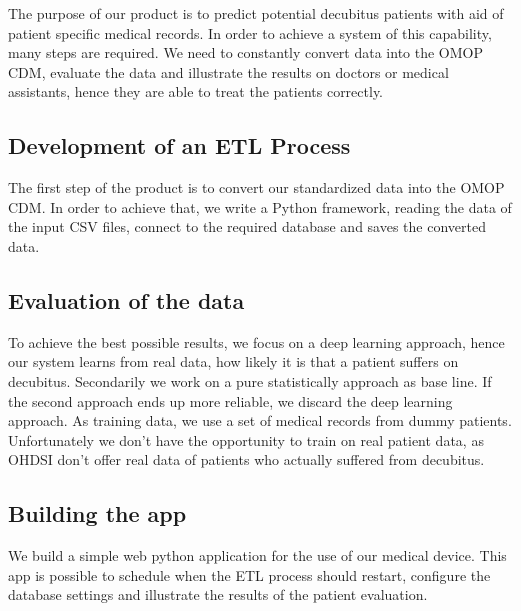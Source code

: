 The purpose of our product is to predict potential decubitus patients with aid of patient specific medical records. In order to achieve a system of this capability, many 
steps are required. We need to constantly convert data into the OMOP CDM, evaluate the data and illustrate the results on doctors or medical assistants, hence they are able 
to treat the patients correctly. 

\subsection{Development of an ETL Process}
The first step of the product is to convert our standardized data into the OMOP CDM. In order to achieve that, we write a Python framework, reading 
the data of the input CSV files, connect to the required database and saves the converted data.

\subsection{Evaluation of the data}
To achieve the best possible results, we focus on a deep learning approach, hence our system learns from real data, how likely it is that a patient suffers on decubitus. Secondarily 
we work on a pure statistically approach as base line. If the second approach ends up more reliable, we discard the deep learning approach. As training data, we use a set 
of medical records from dummy patients. Unfortunately we don't have the opportunity to train on real patient data, as OHDSI don't offer real data of patients who actually suffered 
from decubitus. 

\subsection{Building the app}
We build a simple web python application for the use of our medical device. This app is possible to schedule when the ETL process should restart, configure the database settings and illustrate 
the results of the patient evaluation. 
 
